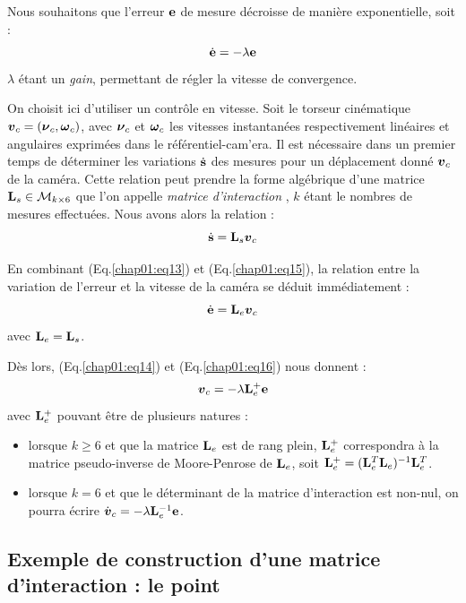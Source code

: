 Nous souhaitons que l'erreur ${\bf e}$ de mesure décroisse de manière 
exponentielle, soit :
\begin{equation}
\dot {\bf e} = - \lambda {\bf e}
\label{chap01:eq14}
\end{equation}
$\lambda$ étant un {\it gain}, permettant de régler la vitesse de convergence.

On choisit ici d'utiliser un contr\^ole en vitesse. Soit le torseur cinématique 
$\hbox{\boldmath $v$}_c = (\hbox{\boldmath $\nu$}_c, \hbox{\boldmath $\omega$}_c)$, avec $\hbox{\boldmath $\nu$}_c$ et $\hbox{\boldmath $\omega$}_c$ les vitesses 
instantanées respectivement linéaires et angulaires exprim\'ees dans le 
r\'ef\'erentiel-cam'era. Il est nécessaire dans un premier temps de déterminer 
les variations $\dot {\bf s}$ des mesures pour un déplacement donné $\hbox{\boldmath $v$}_c$ de 
la caméra. Cette relation peut prendre la forme algébrique d'une matrice ${\bf 
L}_s \in \mathcal M_{k\times 6}$ que l'on appelle {\it matrice d'interaction} 
\cite{espiau1992}, $k$ \'etant le nombres de mesures effectuées. Nous avons 
alors la relation :
\begin{equation}
\dot {\bf s} = {\bf L}_s \hbox{\boldmath $v$}_c
\label{chap01:eq15}
\end{equation}

En combinant (Eq.\ref{chap01:eq13}) et (Eq.\ref{chap01:eq15}), la relation 
entre la variation de l'erreur et la vitesse de la cam\'era se d\'eduit 
imm\'ediatement :
\begin{equation}
\dot {\bf e} = {\bf L}_e \hbox{\boldmath $v$}_c
\label{chap01:eq16}
\end{equation}
avec ${\bf L}_e = {\bf L}_s$.

D\`es lors, (Eq.\ref{chap01:eq14}) et (Eq.\ref{chap01:eq16}) nous 
donnent :
\begin{equation}
{\hbox{\boldmath $v$}}_c = - \lambda {\bf L}^+_e {\bf e}
\label{chap01:eq17}
\end{equation}
avec ${\bf L}^+_e$ pouvant \^etre de plusieurs natures :
\begin{itemize}
 \item lorsque $k \geq 6$ et que la matrice ${\bf L}_e$ est de rang plein, 
${\bf L}^+_e$ correspondra \`a la matrice pseudo-inverse de Moore-Penrose de 
${\bf L}_e$, soit ${\bf L}^+_e = ({\bf L}_e^T{\bf L}_e)^{-1}{\bf L}_e^T$.
\item lorsque $k = 6$ et que le d\'eterminant de la matrice d'interaction est 
non-nul, on pourra \'ecrire $\dot {\hbox{\boldmath $v$}}_c = - \lambda {\bf L}^{-1}_e {\bf e}$.
\end{itemize}


\subsection{Exemple de construction d'une matrice d'interaction : le point}

